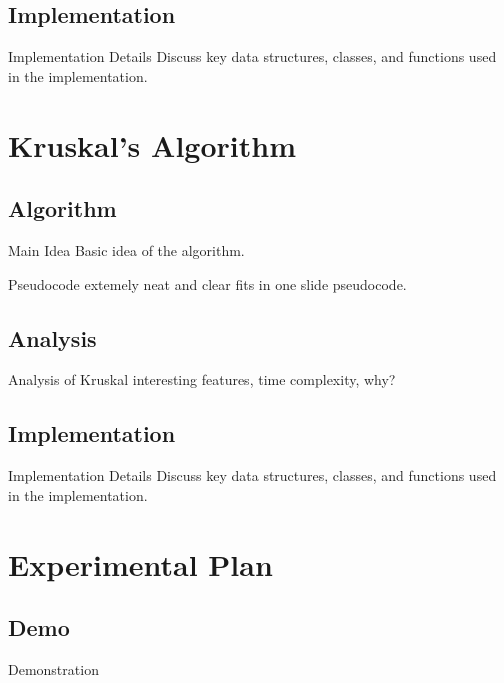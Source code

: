 \documentclass{beamer}
\begin{document}
\subsection{Implementation}
\begin{frame}{Implementation Details}
    Discuss key data structures, classes, and functions used in the
    implementation.
\end{frame}


\section{Kruskal's Algorithm}\frame{\sectionpage}
\subsection{Algorithm}
\begin{frame}{Main Idea}
    Basic idea of the algorithm.
\end{frame}

\begin{frame}{Pseudocode}
    extemely neat and clear fits in one slide pseudocode.
\end{frame}

\subsection{Analysis}
\begin{frame}{Analysis of Kruskal}
    interesting features, time complexity, why?
\end{frame}

\subsection{Implementation}
\begin{frame}{Implementation Details}
    Discuss key data structures, classes, and functions used in the
    implementation.
\end{frame}



\section{Experimental Plan}\frame{\sectionpage}
\subsection{Demo}
\begin{frame}{Demonstration}
\end{frame}
\end{document}
